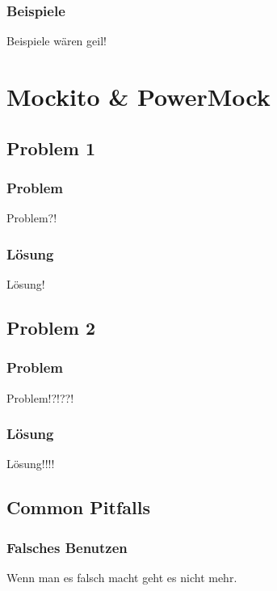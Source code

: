 \documentclass{beamer}
\begin{document}
		\begin{frame}
			\frametitle{Beispiele}
			Beispiele wären geil!
		\end{frame}

	
	\section{Mockito \& PowerMock}


		\subsection{Problem 1}

			\begin{frame}
				\frametitle{Problem}
				Problem?! 
			\end{frame}

			\begin{frame}
				\frametitle{Lösung}
				Lösung!
			\end{frame}


		\subsection{Problem 2}

			\begin{frame}
				\frametitle{Problem}
				Problem!?!??!
			\end{frame}

			\begin{frame}
				\frametitle{Lösung}
				Lösung!!!!
			\end{frame}

		\subsection{Common Pitfalls}

			\begin{frame}
				\frametitle{Falsches Benutzen}
				Wenn man es falsch macht geht es nicht mehr.
			\end{frame}
\end{document}
